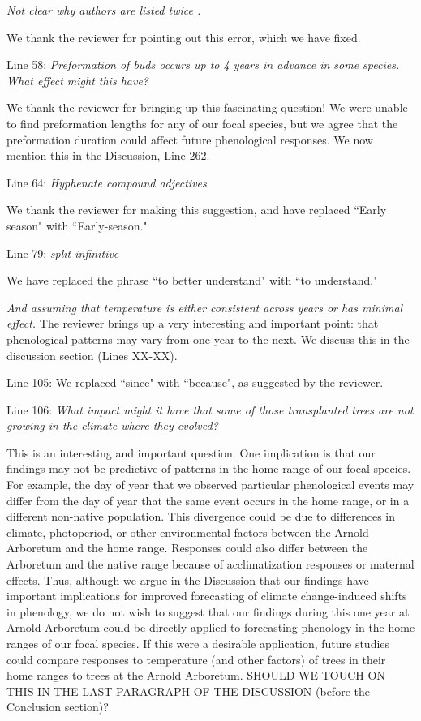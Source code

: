 \documentclass[10.95pt,a4paper]{letter}
\begin{document}
\par \emph{Not clear why authors are listed twice .}
\par We thank the reviewer for pointing out this error, which we have fixed. 

\par Line 58: \emph{Preformation of buds occurs up to 4 years in advance in some species.  What effect might this have?}
\par We thank the reviewer for bringing up this fascinating question! We were unable to find preformation lengths for any of our focal species, but we agree that the preformation duration could affect future phenological responses. We now mention this in the Discussion, Line 262.

\par Line 64: \emph{Hyphenate compound adjectives}
 \par We thank the reviewer for making this suggestion, and have replaced ``Early season" with ``Early-season."
 
 \par Line 79: \emph{split infinitive}
 \par We have replaced the phrase ``to better understand" with ``to understand."
 
\par \emph{And assuming that temperature is either consistent across years or has minimal effect.}
The reviewer brings up a very interesting and important point: that phenological patterns may vary from one year to the next. We discuss this in the discussion section (Lines XX-XX). 

\par Line 105: We replaced ``since" with ``because", as suggested by the reviewer.

\par Line 106: \emph{What impact might it have that some of those transplanted trees are not growing in the climate where they evolved?}
\par This is an interesting and important question. One implication is that our findings may not be predictive of patterns in the home range of our focal species. For example,  the 
day of year that we observed particular phenological events may differ from the day of year that the same event occurs in the home range, or in a different non-native population. This divergence could be due to differences in climate, photoperiod, or other environmental factors between the Arnold Arboretum and the home range. Responses could also differ between the Arboretum and the native range because of acclimatization responses or maternal effects.  Thus, although we argue in the Discussion that our findings have important implications for improved forecasting of climate change-induced shifts in phenology, we do not wish to suggest that our findings during this one year at Arnold Arboretum could be directly applied to forecasting phenology in the home ranges of our focal species. If this were a desirable application, future studies could compare responses to temperature (and other factors) of trees in their home ranges to trees at the Arnold Arboretum. SHOULD WE TOUCH ON THIS IN THE LAST PARAGRAPH OF THE DISCUSSION (before the Conclusion section)?
\end{document}
